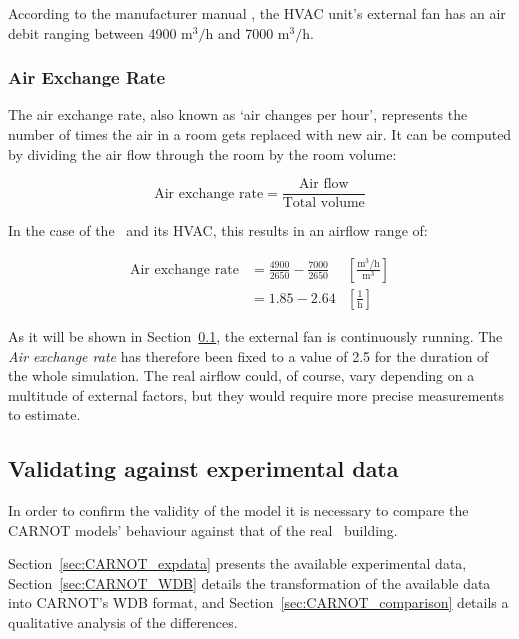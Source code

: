 According to the manufacturer manual \cite{aermecRoofTopManuelSelection}, the
HVAC unit's external fan has an air debit ranging between 4900
$\text{m}^3/\text{h}$ and 7000 $\text{m}^3/\text{h}$.

\subsubsection*{Air Exchange Rate}\label{sec:Air_Exchange_Rate}

The air exchange rate, also known as `air changes per hour', represents the
number of times the air in a room gets replaced with new air. It can be
computed by dividing the air flow through the room by the room volume:

\begin{equation}
    \text{Air exchange rate} = \frac{\text{Air flow}}{\text{Total volume}}
\end{equation}

In the case of the \pdome\ and its HVAC, this results in an airflow range of:

\begin{equation}
    \begin{aligned}
        \text{Air exchange rate} &= \frac{4900}{2650} 
        - \frac{7000}{2650} &\left[\frac{\text{m}^3/\text{h}}{\text{m}^3}\right]\\
                            &= 1.85 - 2.64 &\left[\frac{1}{\text{h}}\right]
    \end{aligned}
\end{equation}

As it will be shown in Section~\ref{sec:CARNOT_experimental}, the external fan
is continuously running. The \textit{Air exchange rate} has therefore been fixed
to a value of 2.5 for the duration of the whole simulation. The real airflow
could, of course, vary depending on a multitude of external factors, but they
would require more precise measurements to estimate.

\subsection{Validating against experimental data}\label{sec:CARNOT_experimental}

In order to confirm the validity of the model it is necessary to compare the
CARNOT models' behaviour against that of the real \pdome\ building.

Section~\ref{sec:CARNOT_expdata} presents the available experimental data,
Section~\ref{sec:CARNOT_WDB} details the transformation of the available data
into CARNOT's WDB format, and Section~\ref{sec:CARNOT_comparison} details a
qualitative analysis of the differences.


